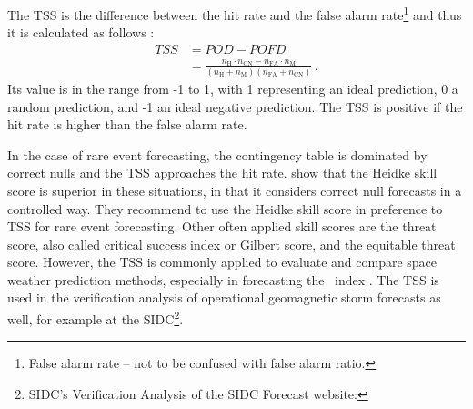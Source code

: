 The TSS is the difference between the hit rate and the false alarm rate\footnote{False alarm rate -- not to be confused with false alarm ratio.} and thus it is calculated as follows \citep[Eq.~15]{Hanssen1965}:
\begin{align}
	\mathit{TSS} &= \mathit{POD} - \mathit{POFD}\\
		&= \frac{n_\text{H} \cdot n_\text{CN} - n_\text{FA} \cdot n_\text{M}}{\left(n_\text{H}+n_\text{M}\right) (n_\text{FA}+n_\text{CN})}	\,.	\nonumber	\label{eq:true_skill_score}
\end{align}
Its value is in the range from -1 to 1, with 1 representing an ideal prediction, 0 a random prediction, and -1 an ideal negative prediction. The TSS is positive if the hit rate is higher than the false alarm rate.

In the case of rare event forecasting, the contingency table is dominated by correct nulls and the TSS approaches the hit rate. \citet{Doswell1990} show that the Heidke skill score is superior in these situations, in that it considers correct null forecasts in a controlled way. They recommend to use the Heidke skill score in preference to TSS for rare event forecasting. Other often applied skill scores are the threat score, also called critical success index or Gilbert score, and the equitable threat score. However, the TSS is commonly applied to evaluate and compare space weather prediction methods, especially in forecasting the \Kp~index \citep{Detman1999,Wing2005,Savani2017}. The TSS is used in the verification analysis of operational geomagnetic storm forecasts as well, for example at the SIDC\footnote{SIDC's Verification Analysis of the SIDC Forecast website: }.




